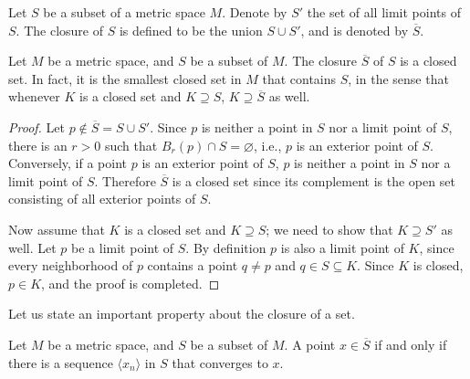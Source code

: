 \begin{defn}
  Let $S$ be a subset of a metric space $M$.
  Denote by $S'$ the set of all limit points of $S$.
  The \textsf{closure} of $S$ is defined to be the union $S \cup S'$, and is denoted by $\overline{S}$.
\end{defn}

\begin{thm}
  Let $M$ be a metric space, and $S$ be a subset of $M$.
  The closure $\overline{S}$ of $S$ is a closed set.
  In fact, it is the smallest closed set in $M$ that contains $S$, in the sense that whenever $K$ is a closed set and $K \supseteq S$, $K \supseteq \overline{S}$ as well.
\end{thm}

\begin{proof}
  Let $p \notin \overline{S} = S \cup S'$.
  Since $p$ is neither a point in $S$ nor a limit point of $S$, there is an $r > 0$ such that $B_r(p) \cap S = \varnothing$, i.e., $p$ is an exterior point of $S$.
  Conversely, if a point $p$ is an exterior point of $S$, $p$ is neither a point in $S$ nor a limit point of $S$.
  Therefore $\overline{S}$ is a closed set since its complement is the open set consisting of all exterior points of $S$.

  Now assume that $K$ is a closed set and $K \supseteq S$; we need to show that $K \supseteq S'$ as well.
  Let $p$ be a limit point of $S$.
  By definition $p$ is also a limit point of $K$, since every neighborhood of $p$ contains a point $q \ne p$ and $q \in S \subseteq K$.
  Since $K$ is closed, $p \in K$, and the proof is completed.
\end{proof}

Let us state an important property about the closure of a set.

\begin{thm}
  Let $M$ be a metric space, and $S$ be a subset of $M$.
  A point $x \in \overline{S}$ if and only if there is a sequence $\langle x_n \rangle$ in $S$ that converges to $x$.
\end{thm}

